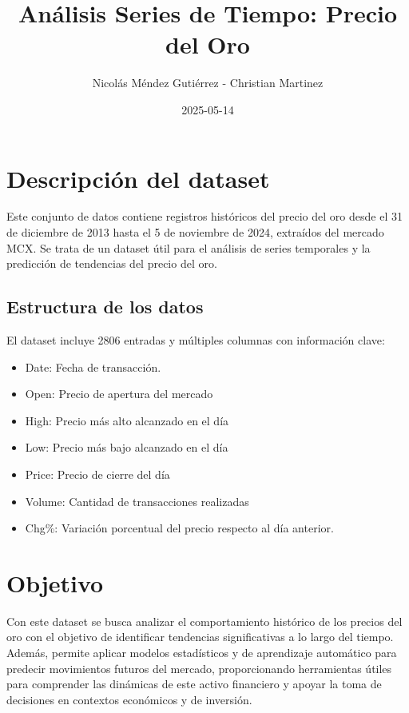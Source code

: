 \documentclass[
]{book}
\title{Análisis Series de Tiempo: Precio del Oro}
\author{Nicolás Méndez Gutiérrez - Christian Martinez}
\date{2025-05-14}
\providecommand{\tightlist}{%
  \setlength{\itemsep}{0pt}\setlength{\parskip}{0pt}}
\begin{document}
\maketitle

{
\setcounter{tocdepth}{1}
\tableofcontents
}
\chapter{Descripción del dataset}\label{descripciuxf3n-del-dataset}

Este conjunto de datos contiene registros históricos del precio del oro desde el 31 de diciembre de 2013 hasta el 5 de noviembre de 2024, extraídos del mercado MCX. Se trata de un dataset útil para el análisis de series temporales y la predicción de tendencias del precio del oro.

\section{Estructura de los datos}\label{estructura-de-los-datos}

El dataset incluye 2806 entradas y múltiples columnas con información clave:

\begin{itemize}
\tightlist
\item
  Date: Fecha de transacción.
\item
  Open: Precio de apertura del mercado
\item
  High: Precio más alto alcanzado en el día
\item
  Low: Precio más bajo alcanzado en el día
\item
  Price: Precio de cierre del día
\item
  Volume: Cantidad de transacciones realizadas
\item
  Chg\%: Variación porcentual del precio respecto al día anterior.
\end{itemize}

\chapter{Objetivo}\label{objetivo}

Con este dataset se busca analizar el comportamiento histórico de los precios del oro con el objetivo de identificar tendencias significativas a lo largo del tiempo. Además, permite aplicar modelos estadísticos y de aprendizaje automático para predecir movimientos futuros del mercado, proporcionando herramientas útiles para comprender las dinámicas de este activo financiero y apoyar la toma de decisiones en contextos económicos y de inversión.
\end{document}
